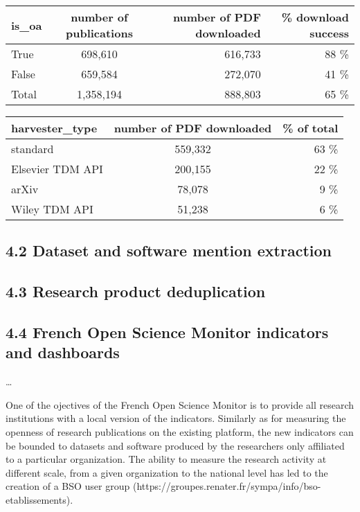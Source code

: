 \documentclass[
]{article}
\begin{document}
\begin{longtable}[]{@{}lcrr@{}}
\toprule
is\_oa & number of publications & number of PDF downloaded & \% download
success\tabularnewline
\midrule
\endhead
True & 698,610 & 616,733 & 88 \%\tabularnewline
False & 659,584 & 272,070 & 41 \%\tabularnewline
Total & 1,358,194 & 888,803 & 65 \%\tabularnewline
\bottomrule
\end{longtable}

\begin{longtable}[]{@{}lcr@{}}
\toprule
harvester\_type & number of PDF downloaded & \% of total\tabularnewline
\midrule
\endhead
standard & 559,332 & 63 \%\tabularnewline
Elsevier TDM API & 200,155 & 22 \%\tabularnewline
arXiv & 78,078 & 9 \%\tabularnewline
Wiley TDM API & 51,238 & 6 \%\tabularnewline
\bottomrule
\end{longtable}

\hypertarget{dataset-and-software-mention-extraction}{%
\subsection{4.2 Dataset and software mention
extraction}\label{dataset-and-software-mention-extraction}}

\hypertarget{research-product-deduplication}{%
\subsection{4.3 Research product
deduplication}\label{research-product-deduplication}}

\hypertarget{french-open-science-monitor-indicators-and-dashboards}{%
\subsection{4.4 French Open Science Monitor indicators and
dashboards}\label{french-open-science-monitor-indicators-and-dashboards}}

\ldots{}

One of the ojectives of the French Open Science Monitor is to provide
all research institutions with a local version of the indicators.
Similarly as for measuring the openness of research publications on the
existing platform, the new indicators can be bounded to datasets and
software produced by the researchers only affiliated to a particular
organization. The ability to measure the research activity at different
scale, from a given organization to the national level has led to the
creation of a BSO user group
(https://groupes.renater.fr/sympa/info/bso-etablissements).
\end{document}
